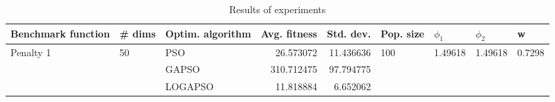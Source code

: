 \begin{table}
\centering
\caption{Results of experiments}
\begin{tabular}{lllrrllll}
\toprule
        Benchmark function &             \# dims & Optim. algorithm &  Avg. fitness &  Std. dev. &            Pop. size &               $\phi_{1}$ &               $\phi_{2}$ &                       w \\
\midrule
\multirow{3}{*}{Penalty 1} & \multirow{3}{*}{50} &              PSO &     26.573072 &  11.436636 & \multirow{3}{*}{100} & \multirow{3}{*}{1.49618} & \multirow{3}{*}{1.49618} & \multirow{3}{*}{0.7298} \\
                           &                     &            GAPSO &    310.712475 &  97.794775 &                      &                          &                          &                         \\
                           &                     &          LOGAPSO &     11.818884 &   6.652062 &                      &                          &                          &                         \\
\bottomrule
\end{tabular}
\end{table}
